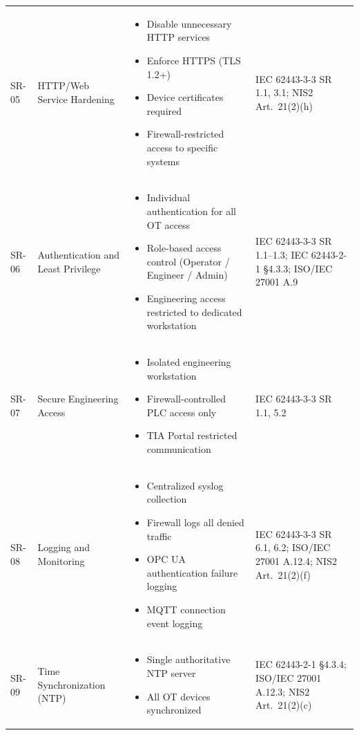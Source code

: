 \begin{longtable}{p{1.2cm} p{3.2cm} p{5.2cm} p{4.2cm}}
SR-05 & HTTP/Web Service Hardening &
\begin{itemize}[leftmargin=*, noitemsep, topsep=2pt]
\item Disable unnecessary HTTP services
\item Enforce HTTPS (TLS 1.2+)
\item Device certificates required
\item Firewall-restricted access to specific systems
\end{itemize}
&
IEC 62443-3-3 SR 1.1, 3.1; NIS2 Art.~21(2)(h) \\

SR-06 & Authentication and Least Privilege &
\begin{itemize}[leftmargin=*, noitemsep, topsep=2pt]
\item Individual authentication for all OT access
\item Role-based access control (Operator / Engineer / Admin)
\item Engineering access restricted to dedicated workstation
\end{itemize}
&
IEC 62443-3-3 SR 1.1--1.3; IEC 62443-2-1 §4.3.3; ISO/IEC 27001 A.9 \\

SR-07 & Secure Engineering Access &
\begin{itemize}[leftmargin=*, noitemsep, topsep=2pt]
\item Isolated engineering workstation
\item Firewall-controlled PLC access only
\item TIA Portal restricted communication
\end{itemize}
&
IEC 62443-3-3 SR 1.1, 5.2 \\

SR-08 & Logging and Monitoring &
\begin{itemize}[leftmargin=*, noitemsep, topsep=2pt]
\item Centralized syslog collection
\item Firewall logs all denied traffic
\item OPC UA authentication failure logging
\item MQTT connection event logging
\end{itemize}
&
IEC 62443-3-3 SR 6.1, 6.2; ISO/IEC 27001 A.12.4; NIS2 Art.~21(2)(f) \\

SR-09 & Time Synchronization (NTP) &
\begin{itemize}[leftmargin=*, noitemsep, topsep=2pt]
\item Single authoritative NTP server
\item All OT devices synchronized
\end{itemize}
&
IEC 62443-2-1 §4.3.4; ISO/IEC 27001 A.12.3; NIS2 Art.~21(2)(c) \\


\end{longtable}
